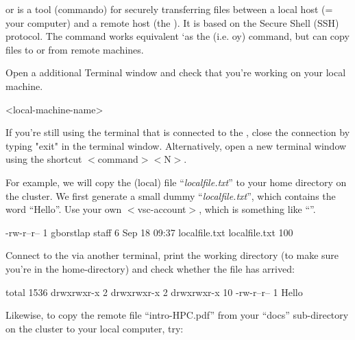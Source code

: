    or  is a tool (commando) for securely
  transferring files between a local host (= your computer) and a remote host
  (the \hpc). It is based on the Secure Shell (SSH) protocol.  The 
  command works equivalent `as the   (i.e. oy)
  command, but can copy files to or from remote machines.

  Open a additional Terminal window and check that you're working on your local machine.

  \begin{prompt}
  <local-machine-name>
  \end{prompt}

  If you're still using the terminal that is connected to the \hpc, close the
  connection by typing "exit" in the terminal window. Alternatively, open a new
  terminal window using the shortcut $<$command$>$$<$N$>$.

  For example, we will copy the (local) file ``\emph{localfile.txt}'' to your
  home directory on the \hpc cluster. We first generate a small dummy
  ``\emph{localfile.txt}'', which contains the word ``Hello''.  Use your own
  $<$vsc-account$>$, which is something like ``\emph{\userid}''.

  \begin{prompt}
  -rw-r--r-- 1 gborstlap  staff   6 Sep 18 09:37 localfile.txt
  localfile.txt    100%
  \end{prompt}

  Connect to the \hpc via another terminal, print the working directory (to make
  sure you're in the home-directory) and check whether the file has arrived:

  \begin{prompt}
  total 1536
  drwxrwxr-x  2 %
  drwxrwxr-x  2 %
  drwxrwxr-x 10 %
  -rw-r--r--  1 %
  Hello
  \end{prompt}

  Likewise, to copy the remote file ``intro-HPC.pdf'' from your ``docs''
  sub-directory on the cluster to your local computer, try:

